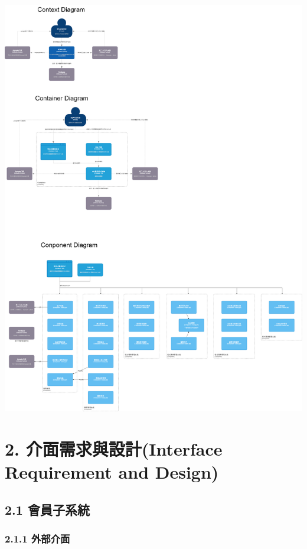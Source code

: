 \documentclass{report}
\begin{document}
\includegraphics[width=\textwidth]{assets/SCAFC4.png}

\section*{2. 介面需求與設計(Interface Requirement and Design)}

\newcolumntype{R}{X}

\subsection*{2.1 會員子系統}

\subsubsection*{2.1.1 外部介面}
\end{document}
